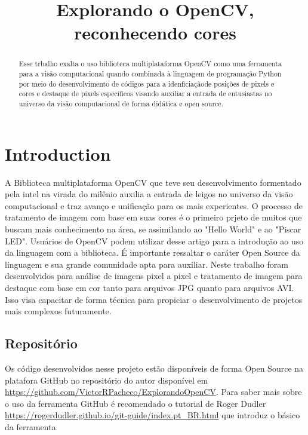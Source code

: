 \documentclass{bmvc2k}
\title{Explorando o OpenCV, reconhecendo cores}
\begin{document}
\maketitle

\begin{abstract}
Esse trbalho exalta o uso biblioteca multiplataforma OpenCV como uma ferramenta para a visão computacional quando combinada à linguagem de programação Python por meio do desenvolvimento de códigos para a idenficiaçãode posições de pixels e cores e destaque de pixels específicos visando auxiliar a entrada de entusiastas no universo da visão computacional de forma didática e open source.

\end{abstract}

\section{Introduction}
\label{sec:intro}
A Biblioteca multiplataforma OpenCV \cite{[OpenCVOrg]} que teve seu desenvolvimento formentado pela intel na virada do milênio auxilia a entrada de leigos no universo da  visão computacional e traz avanço e unificação para os mais experientes.
O processo de tratamento de imagem com base em suas cores é o primeiro prjeto de muitos que buscam mais conhecimento na área, se assimilando ao "Hello World" e ao "Piscar LED".
Usuários de OpenCV podem utilizar desse artigo para a introdução ao uso da linguagem com a biblioteca. É importante ressaltar o caráter Open Source da linguagem e sua grande comunidade apta para auxiliar. 
Neste trabalho foram desenvolvidos para análise de imagens pixel a pixel e tratamento de imagem para destaque com base em cor tanto para arquivos JPG quanto para arquivos AVI. Isso visa capacitar de forma técnica para propiciar o desenvolvimento de projetos mais complexos futuramente.

\subsection{Repositório}
Os código desenvolvidos nesse projeto estão disponíveis de forma Open Source na platafora GitHub no repositório do autor disponível em \url{https://github.com/VictorRPacheco/ExplorandoOpenCV}.
Para saber mais sobre o uso da ferramenta GitHub é recomendado o tutorial de Roger Dudler \url{https://rogerdudler.github.io/git-guide/index.pt_BR.html} que introduz o básico da ferramenta
\end{document}

